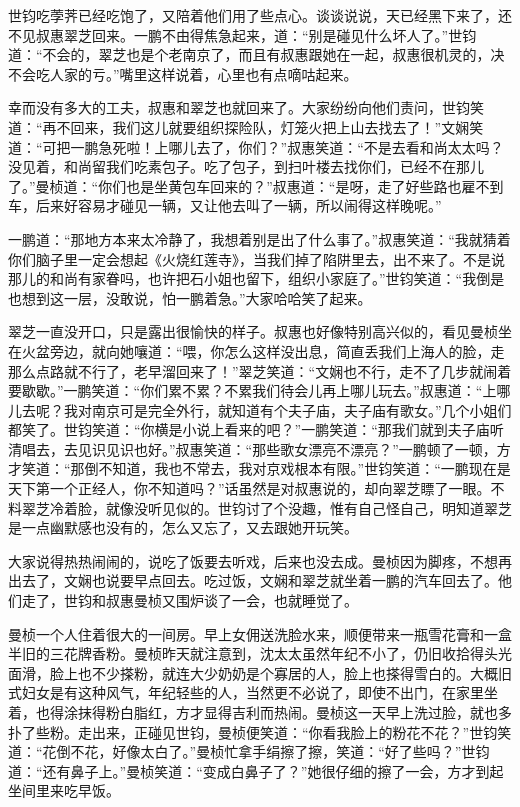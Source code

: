 \par 世钧吃荸荠已经吃饱了，又陪着他们用了些点心。谈谈说说，天已经黑下来了，还不见叔惠翠芝回来。一鹏不由得焦急起来，道：“别是碰见什么坏人了。”世钧道：“不会的，翠芝也是个老南京了，而且有叔惠跟她在一起，叔惠很机灵的，决不会吃人家的亏。”嘴里这样说着，心里也有点嘀咕起来。
\par 幸而没有多大的工夫，叔惠和翠芝也就回来了。大家纷纷向他们责问，世钧笑道：“再不回来，我们这儿就要组织探险队，灯笼火把上山去找去了！”文娴笑道：“可把一鹏急死啦！上哪儿去了，你们？”叔惠笑道：“不是去看和尚太太吗？没见着，和尚留我们吃素包子。吃了包子，到扫叶楼去找你们，已经不在那儿了。”曼桢道：“你们也是坐黄包车回来的？”叔惠道：“是呀，走了好些路也雇不到车，后来好容易才碰见一辆，又让他去叫了一辆，所以闹得这样晚呢。”
\par 一鹏道：“那地方本来太冷静了，我想着别是出了什么事了。”叔惠笑道：“我就猜着你们脑子里一定会想起《火烧红莲寺》，当我们掉了陷阱里去，出不来了。不是说那儿的和尚有家眷吗，也许把石小姐也留下，组织小家庭了。”世钧笑道：“我倒是也想到这一层，没敢说，怕一鹏着急。”大家哈哈笑了起来。
\par 翠芝一直没开口，只是露出很愉快的样子。叔惠也好像特别高兴似的，看见曼桢坐在火盆旁边，就向她嚷道：“喂，你怎么这样没出息，简直丢我们上海人的脸，走那么点路就不行了，老早溜回来了！”翠芝笑道：“文娴也不行，走不了几步就闹着要歇歇。”一鹏笑道：“你们累不累？不累我们待会儿再上哪儿玩去。”叔惠道：“上哪儿去呢？我对南京可是完全外行，就知道有个夫子庙，夫子庙有歌女。”几个小姐们都笑了。世钧笑道：“你横是小说上看来的吧？”一鹏笑道：“那我们就到夫子庙听清唱去，去见识见识也好。”叔惠笑道：“那些歌女漂亮不漂亮？”一鹏顿了一顿，方才笑道：“那倒不知道，我也不常去，我对京戏根本有限。”世钧笑道：“一鹏现在是天下第一个正经人，你不知道吗？”话虽然是对叔惠说的，却向翠芝瞟了一眼。不料翠芝冷着脸，就像没听见似的。世钧讨了个没趣，惟有自己怪自己，明知道翠芝是一点幽默感也没有的，怎么又忘了，又去跟她开玩笑。
\par 大家说得热热闹闹的，说吃了饭要去听戏，后来也没去成。曼桢因为脚疼，不想再出去了，文娴也说要早点回去。吃过饭，文娴和翠芝就坐着一鹏的汽车回去了。他们走了，世钧和叔惠曼桢又围炉谈了一会，也就睡觉了。
\par 曼桢一个人住着很大的一间房。早上女佣送洗脸水来，顺便带来一瓶雪花膏和一盒半旧的三花牌香粉。曼桢昨天就注意到，沈太太虽然年纪不小了，仍旧收拾得头光面滑，脸上也不少搽粉，就连大少奶奶是个寡居的人，脸上也搽得雪白的。大概旧式妇女是有这种风气，年纪轻些的人，当然更不必说了，即使不出门，在家里坐着，也得涂抹得粉白脂红，方才显得吉利而热闹。曼桢这一天早上洗过脸，就也多扑了些粉。走出来，正碰见世钧，曼桢便笑道：“你看我脸上的粉花不花？”世钧笑道：“花倒不花，好像太白了。”曼桢忙拿手绢擦了擦，笑道：“好了些吗？”世钧道：“还有鼻子上。”曼桢笑道：“变成白鼻子了？”她很仔细的擦了一会，方才到起坐间里来吃早饭。
